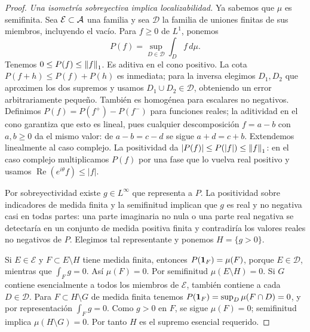 \begin{proof}
\emph{Una isometría sobreyectiva implica localizabilidad.} Ya sabemos que $\mu$ es semifinita. Sea $\mathcal E\subset\mathcal A$ una familia y sea $\mathcal D$ la familia de uniones finitas de sus miembros, incluyendo el vacío. Para $f\ge0$ de $L^1$, ponemos
\[
 P(f)=\sup_{D\in\mathcal D}\int_D f\,d\mu.
\]
Tenemos $0\le P(f)\le\left\lVert f\right\rVert_1$. Es aditiva en el cono positivo. La cota $P(f+h)\le P(f)+P(h)$ es inmediata; para la inversa elegimos $D_1,D_2$ que aproximen los dos supremos y usamos $D_1\cup D_2\in\mathcal D$, obteniendo un error arbitrariamente pequeño. También es homogénea para escalares no negativos. Definimos $P(f)=P(f^+)-P(f^-)$ para funciones reales; la aditividad en el cono garantiza que esto es lineal, pues cualquier descomposición $f=a-b$ con $a,b\ge0$ da el mismo valor: de $a-b=c-d$ se sigue $a+d=c+b$. Extendemos linealmente al caso complejo. La positividad da $|P(f)|\le P(|f|)\le\left\lVert f\right\rVert_1$: en el caso complejo multiplicamos $P(f)$ por una fase que lo vuelva real positivo y usamos $\operatorname{Re}(e^{i\theta}f)\le|f|$.

Por sobreyectividad existe $g\in L^\infty$ que representa a $P$. La positividad sobre indicadores de medida finita y la semifinitud implican que $g$ es real y no negativa casi en todas partes: una parte imaginaria no nula o una parte real negativa se detectaría en un conjunto de medida positiva finita y contradiría los valores reales no negativos de $P$. Elegimos tal representante y ponemos $H=\{g>0\}$.

Si $E\in\mathcal E$ y $F\subset E\setminus H$ tiene medida finita, entonces $P(\mathbf1_{F})=\mu(F)$, porque $E\in\mathcal D$, mientras que $\int_Fg=0$. Así $\mu(F)=0$. Por semifinitud $\mu(E\setminus H)=0$. Si $G$ contiene esencialmente a todos los miembros de $\mathcal E$, también contiene a cada $D\in\mathcal D$. Para $F\subset H\setminus G$ de medida finita tenemos $P(\mathbf1_{F})=\sup_D\mu(F\cap D)=0$, y por representación $\int_Fg=0$. Como $g>0$ en $F$, se sigue $\mu(F)=0$; semifinitud implica $\mu(H\setminus G)=0$. Por tanto $H$ es el supremo esencial requerido.
\end{proof}

